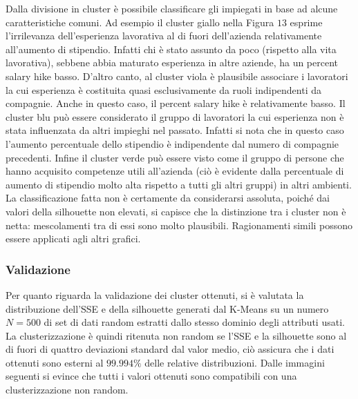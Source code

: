 \documentclass[a4paper,9pt]{article}
\begin{document}
Dalla divisione in cluster è possibile classificare gli impiegati in base ad alcune caratteristiche comuni.
Ad esempio il cluster giallo nella Figura $13$  esprime l'irrilevanza dell'esperienza lavorativa al di fuori dell'azienda relativamente all'aumento di stipendio. Infatti chi è stato assunto da poco (rispetto alla vita lavorativa), sebbene abbia maturato esperienza in altre aziende, ha un percent salary hike basso.
D'altro canto, al cluster viola è plausibile associare i lavoratori la cui esperienza è costituita quasi esclusivamente da ruoli indipendenti da compagnie. Anche in questo caso, il percent salary hike è relativamente basso.
Il cluster blu può essere considerato il gruppo di lavoratori la cui esperienza non è stata influenzata da altri impieghi nel passato. Infatti si nota che in questo caso l'aumento percentuale dello stipendio è indipendente dal numero di compagnie precedenti.
Infine il cluster verde può essere visto come il gruppo di persone che hanno acquisito competenze utili all'azienda (ciò è evidente dalla percentuale di aumento di stipendio molto alta rispetto a tutti gli altri gruppi) in altri ambienti.\\
La classificazione fatta non è certamente da considerarsi assoluta, poiché dai valori della silhouette non elevati, si capisce che la distinzione tra i cluster non è netta: mescolamenti tra di essi sono molto plausibili.
Ragionamenti simili possono essere applicati agli altri grafici.

\subsubsection{Validazione}
Per quanto riguarda la validazione dei cluster ottenuti, si è valutata la distribuzione dell'SSE e della silhouette generati dal K-Means su un numero $N=500$ di set di dati random estratti dallo stesso dominio degli attributi usati. La clusterizzazione è quindi ritenuta non random se l'SSE e la silhouette sono al di fuori di quattro deviazioni standard dal valor medio, ciò assicura che i dati ottenuti sono esterni al $99.994\%$  delle relative distribuzioni.
Dalle immagini seguenti si evince che tutti i valori ottenuti sono compatibili con una clusterizzazione non random.
\end{document}
